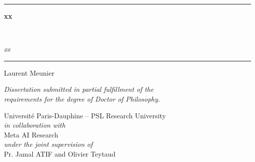 
\begin{titlepage}

	\begin{center}
    \textcolor{PSLBlue}{\hrule}
    \vskip 0.8cm
        \begin{center}
            \begin{Huge}
                \textcolor{PSLBlue}{\textbf{xx}}
            \end{Huge}\\[10pt]
            \begin{LARGE}
                \textcolor{PSLBlue}{\emph{xx}}
            \end{LARGE}
        \end{center}
    \vskip 0.1cm
    \textcolor{PSLBlue}{\hrule}
    \vskip 1cm
        \begin{Large}
        Laurent Meunier
        \end{Large}
		\vfill
	    \begin{Large}	
   	     \emph{Dissertation submitted in partial fulfillment of the \\ requirements for the degree of Doctor of Philosophy.}
        \end{Large}
                 
    	\vfill
    	
	\begin{Large}
	   Universit\'e Paris-Dauphine -- PSL Research University \\[0.5cm] 
	   \emph{in collaboration with} \\[0.5cm] 
	   Meta AI Research \\[0.5cm] 
	   \emph{under the joint supervision of} \\[0.5cm]
                    
        Pr. Jamal ATIF and Olivier Teytaud
	\end{Large}
\end{center}

\newpage
\null
\thispagestyle{empty}
\newpage

\end{titlepage}






